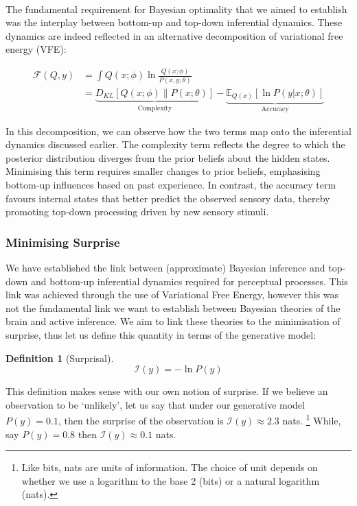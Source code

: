 \documentclass{article}
\newtheorem{definition}{Definition}
\begin{document}
\

The fundamental requirement for Bayesian optimality that we aimed to establish was the interplay between bottom-up and top-down inferential dynamics. These dynamics are indeed reflected in an alternative decomposition of variational free energy (VFE):

\begin{equation}
\begin{aligned}
	\mathcal{F}(Q, y) &=  \int Q(x; \phi) \ln \frac{Q(x; \phi)}{P(x, y; \theta)} \\ 
	&= \underbrace{D_{KL}\left[ Q(x; \phi) \| P(x; \theta)  \right]}_{\text{Complexity}} - \underbrace{\mathbb{E}_{Q(x)}\left[ \ln P(y | x; \theta) \right]}_{\text{Accuracy}}
\end{aligned}
\end{equation}


In this decomposition, we can observe how the two terms map onto the inferential dynamics discussed earlier. The complexity term reflects the degree to which the posterior distribution diverges from the prior beliefs about the hidden states. Minimising this term requires smaller changes to prior beliefs, emphasising bottom-up influences based on past experience.  In contrast, the accuracy term favours internal states that better predict the observed sensory data, thereby promoting top-down processing driven by new sensory stimuli.

\subsubsection{Minimising Surprise}

We have established the link between (approximate) Bayesian inference and top-down and bottom-up inferential dynamics required for perceptual processes. This link was achieved through the use of Variational Free Energy, however this was not the fundamental link we want to establish between Bayesian theories of the brain and active inference. We aim to link these theories to the minimisation of surprise, thus let us define this quantity in terms of the generative model:

\begin{definition}[Surprisal]\label{eq:surprisal}
	$$\mathcal{I}(y) = - \ln P(y)$$
\end{definition}

This definition makes sense with our own notion of surprise. If we believe an observation to be `unlikely', let us say that under our generative model $P(y) = 0.1$, then the surprise of the observation is $ \mathcal{I}(y) \approx 2.3$ nats. \footnote{Like bits, nats are units of information. The choice of unit depends on whether we use a logarithm to the base 2 (bits) or a natural logarithm (nats).} While, say $P(y) = 0.8$ then $\mathcal{I}(y) \approx 0.1$ nats. 
\end{document}
